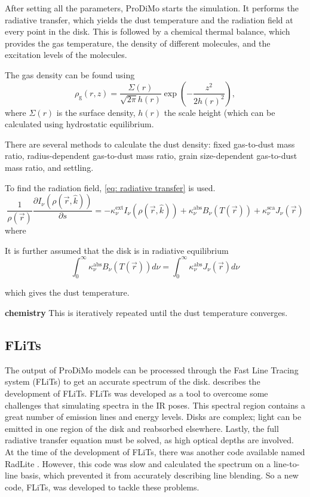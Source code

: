 \documentclass[oneside, single, authoryear, semicolon, 12pt]{lion-msc}
\renewcommand{\vec}[1] {\ensuremath{ \overrightarrow{ #1 } }}
\newcommand{\4}{$_4$}
\newcommand{\3}{$_3$}
\newcommand{\2}{$_2$}
\begin{document}
After setting all the parameters, ProDiMo starts the simulation. It performs the radiative transfer, which yields the dust temperature and the radiation field at every point in the disk. This is followed by a chemical thermal balance, which provides the gas temperature, the density of different molecules, and the excitation levels of the molecules. 

The gas density can be found using
\begin{equation}
    \rho_\mathrm{g}(r,z)=\frac{\Sigma(r)}{\sqrt{2\pi}h(r)}\exp{\left(-\frac{z^2}{2h(r)^2}\right)},
    \label{eq: density}
\end{equation}
where $\Sigma(r)$ is the surface density, $h(r)$ the scale height (which can be calculated using hydrostatic equilibrium. 

There are several methods to calculate the dust density: fixed gas-to-dust mass ratio, radius-dependent gas-to-dust mass ratio, grain size-dependent gas-to-dust mass ratio, and settling. 

To find the radiation field, \autoref{eq: radiative transfer} is used.
\begin{equation}
    \frac{1}{\rho(\vec{r})}\frac{\partial I_\nu(\rho(\vec{r}, \hat{k}))}{\partial s}=-\kappa^{\mathrm{ext}}_\nu I_\nu(\rho(\vec{r}, \hat{k})) + \kappa^{\mathrm{abs}}_\nu B_\nu(T(\vec{r})) + \kappa^{\mathrm{sca}}_\nu J_\nu(\vec{r})
    \label{eq: radiative transfer}
\end{equation}
where 

It is further assumed that the disk is in radiative equilibrium 
\begin{equation}
    \int^\infty_0\kappa^{\mathrm{abs}}_\nu B_\nu(T(\vec{r}))d\nu=\int^\infty_0\kappa^{\mathrm{abs}}_\nu J_\nu(\vec{r})d\nu
\end{equation}

which gives the dust temperature. 

\textbf{chemistry}
This is iteratively repeated until the dust temperature converges.
\subsection{FLiTs}
The output of ProDiMo models can be processed through the Fast Line Tracing system (FLiTs) to get an accurate spectrum of the disk. \cite{Woitke_2018} describes the development of FLiTs. FLiTs was developed as a tool to overcome some challenges that simulating spectra in the IR poses. This spectral region contains a great number of emission lines and energy levels. Disks are complex; light can be emitted in one region of the disk and reabsorbed elsewhere. Lastly, the full radiative transfer equation must be solved, as high optical depths are involved. At the time of the development of FLiTs, there was another code available named RadLite \citep{Pontoppidan_2009}. However, this code was slow and 
calculated the spectrum on a line-to-line basis, which prevented it from accurately describing line blending. So a new code, FLiTs, was developed to tackle these problems. 
\end{document}
